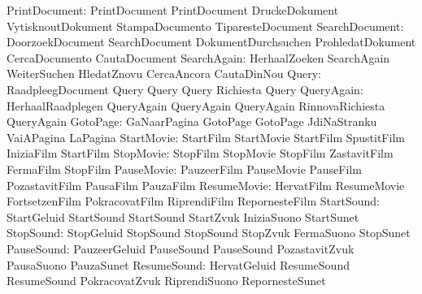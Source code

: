             PrintDocument: PrintDocument             PrintDocument
                           DruckeDokument            VytisknoutDokument
                           StampaDocumento           TiparesteDocument
           SearchDocument: DoorzoekDocument          SearchDocument
                           DokumentDurchsuchen       ProhledatDokument
                           CercaDocumento            CautaDocument
              SearchAgain: HerhaalZoeken             SearchAgain
                           WeiterSuchen              HledatZnovu
                           CercaAncora               CautaDinNou
                    Query: RaadpleegDocument         Query
                           Query                     Query
                           Richiesta                 Query %
               QueryAgain: HerhaalRaadplegen         QueryAgain
                           QueryAgain                QueryAgain
                           RinnovaRichiesta          QueryAgain %
                 GotoPage: GaNaarPagina              GotoPage
                           GotoPage                  JdiNaStranku
                           VaiAPagina                LaPagina %
               StartMovie: StartFilm                 StartMovie
                           StartFilm                 SpustitFilm
                           IniziaFilm                StartFilm
                StopMovie: StopFilm                  StopMovie
                           StopFilm                  ZastavitFilm
                           FermaFilm                 StopFilm
               PauseMovie: PauzeerFilm               PauseMovie
                           PauseFilm                 PozastavitFilm
                           PausaFilm                 PauzaFilm
              ResumeMovie: HervatFilm                ResumeMovie
                           FortsetzenFilm            PokracovatFilm
                           RiprendiFilm              RepornesteFilm
               StartSound: StartGeluid               StartSound
                           StartSound                StartZvuk
                           IniziaSuono               StartSunet %
                StopSound: StopGeluid                StopSound
                           StopSound                 StopZvuk
                           FermaSuono                StopSunet %
               PauseSound: PauzeerGeluid             PauseSound
                           PauseSound                PozastavitZvuk
                           PausaSuono                PauzaSunet %
              ResumeSound: HervatGeluid              ResumeSound
                           ResumeSound               PokracovatZvuk
                           RiprendiSuono             RepornesteSunet %

